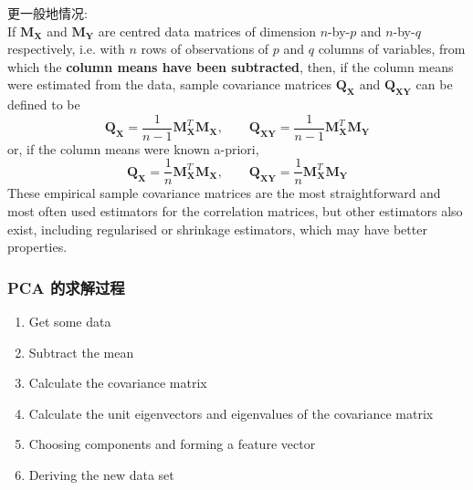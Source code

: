\documentclass{article}
\begin{document}
更一般地情况:\\
If $\mathbf{M}_{\mathbf{X}}$ and $\mathbf{M}_{\mathbf{Y}}$ are centred data matrices of dimension $n$-by-$p$ and $n$-by-$q$ respectively, i.e. with $n$ rows of observations of $p$ and $q$ columns of variables, from which the \textbf{column means have been subtracted}, then, if the column means were estimated from the data, sample covariance matrices $\mathbf{Q}_{\mathbf{X}}$ and $\mathbf{Q}_{\mathbf{XY}}$ can be defined to be
$$
\mathbf{Q}_{\mathbf{X}} = \frac{1}{n-1} \mathbf{M}_{\mathbf{X}}^T \mathbf{M}_{\mathbf{X}}, \qquad \mathbf{Q}_{\mathbf{XY}} = \frac{1}{n-1} \mathbf{M}_{\mathbf{X}}^T \mathbf{M}_{\mathbf{Y}}
$$
or, if the column means were known a-priori,
$$
\mathbf{Q}_{\mathbf{X}} = \frac{1}{n} \mathbf{M}_{\mathbf{X}}^T \mathbf{M}_{\mathbf{X}}, \qquad \mathbf{Q}_{\mathbf{XY}} = \frac{1}{n} \mathbf{M}_{\mathbf{X}}^T \mathbf{M}_{\mathbf{Y}}
$$
These empirical sample covariance matrices are the most straightforward and most often used estimators for the correlation matrices, but other estimators also exist, including regularised or shrinkage estimators, which may have better properties.

\subsubsection{PCA 的求解过程}
\begin{enumerate}
\item Get some data
\item Subtract the mean
\item Calculate the covariance matrix
\item Calculate the unit eigenvectors and eigenvalues of the covariance matrix
\item Choosing components and forming a feature vector
\item Deriving the new data set
\end{enumerate}
\end{document}
